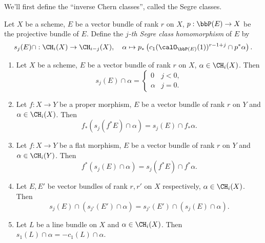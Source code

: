   We'll first define the ``inverse Chern classes'', called the Segre classes.

  \begin{definition}
    Let $X$ be a scheme, $E$ be a vector bundle of rank $r$ on $X$, $p: \bbP(E) \to X$ be the projective bundle of $E$.
    Define the \emph{$j$-th Segre class homomorphism}  of $E$ by
    \[ s_j(E) \cap : \CH_i(X) \to \CH_{i-j}(X), \quad \alpha \mapsto p_*\left(c_1(\calO_{\bbP(E)}(1))^{r-1+j} \cap p^*\alpha\right). \]
  \end{definition}

  \begin{proposition}
    \begin{enumerate}
      \item Let $X$ be a scheme, $E$ be a vector bundle of rank $r$ on $X$, $\alpha \in \CH_i(X)$.
      Then 
      \[ s_j(E) \cap \alpha = \begin{cases}
          0 & j < 0, \\
          \alpha & j = 0.
      \end{cases} \]

      \item Let $f: X \to Y$ be a proper morphism, $E$ be a vector bundle of rank $r$ on $Y$ and $\alpha \in \CH_i(X)$.
      Then
      \[ f_*( s_j(f^*E) \cap \alpha ) = s_j(E) \cap f_*\alpha. \]

      \item Let $f: X \to Y$ be a flat morphism, $E$ be a vector bundle of rank $r$ on $Y$ and $\alpha \in \CH_i(Y)$.
      Then
      \[ f^*( s_j(E) \cap \alpha ) = s_j(f^*E) \cap f^*\alpha. \]

      \item Let $E,E'$ be vector bundles of rank $r,r'$ on $X$ respectively, $\alpha \in \CH_i(X)$.
      Then
      \[ s_j(E) \cap ( s_{j'}(E') \cap \alpha ) = s_{j'}( E') \cap ( s_j(E) \cap \alpha ). \]

      \item Let $L$ be a line bundle on $X$ and $\alpha \in \CH_i(X)$.
      Then $s_1(L) \cap \alpha = - c_1(L) \cap \alpha$.
    \end{enumerate}
  \end{proposition}
